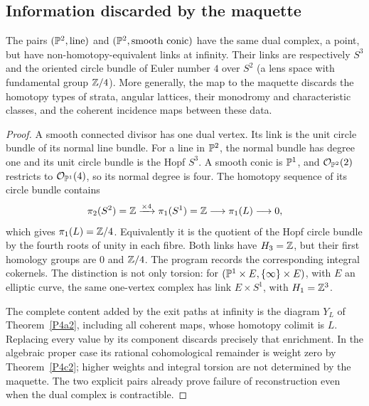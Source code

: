 \subsection{Information discarded by the maquette}

\begin{proposition}
\label{P4e}
The pairs $(\mathbb P^2,\text{line})$ and $(\mathbb P^2,\text{smooth conic})$ have the same dual complex, a point, but have non-homotopy-equivalent links at infinity.  Their links are respectively $S^3$ and the oriented circle bundle of Euler number $4$ over $S^2$ (a lens space with fundamental group $\mathbb Z/4$).  More generally, the map to the maquette discards the homotopy types of strata, angular lattices, their monodromy and characteristic classes, and the coherent incidence maps between these data.
\end{proposition}
\begin{proof}
A smooth connected divisor has one dual vertex.  Its link is the unit circle bundle of its normal line bundle.  For a line in $\mathbb P^2$, the normal bundle has degree one and its unit circle bundle is the Hopf $S^3$.  A smooth conic is $\mathbb P^1$, and $\mathcal O_{\mathbb P^2}(2)$ restricts to $\mathcal O_{\mathbb P^1}(4)$, so its normal degree is four.  The homotopy sequence of its circle bundle contains
\[
 \pi_2(S^2)=\mathbb Z\xrightarrow{\times4}\pi_1(S^1)=\mathbb Z
 \longrightarrow\pi_1(L)\longrightarrow0,
\]
which gives $\pi_1(L)=\mathbb Z/4$.  Equivalently it is the quotient of the Hopf circle bundle by the fourth roots of unity in each fibre.  Both links have $H_3=\mathbb Z$, but their first homology groups are $0$ and $\mathbb Z/4$.  The program records the corresponding integral cokernels.  The distinction is not only torsion: for $(\mathbb P^1\times E,\{\infty\}\times E)$, with $E$ an elliptic curve, the same one-vertex complex has link $E\times S^1$, with $H_1=\mathbb Z^3$.

The complete content added by the exit paths at infinity is the diagram $Y_L$ of Theorem~\ref{P4a2}, including all coherent maps, whose homotopy colimit is $L$.  Replacing every value by its component discards precisely that enrichment.  In the algebraic proper case its rational cohomological remainder is weight zero by Theorem~\ref{P4c2}; higher weights and integral torsion are not determined by the maquette.  The two explicit pairs already prove failure of reconstruction even when the dual complex is contractible.
\end{proof}
